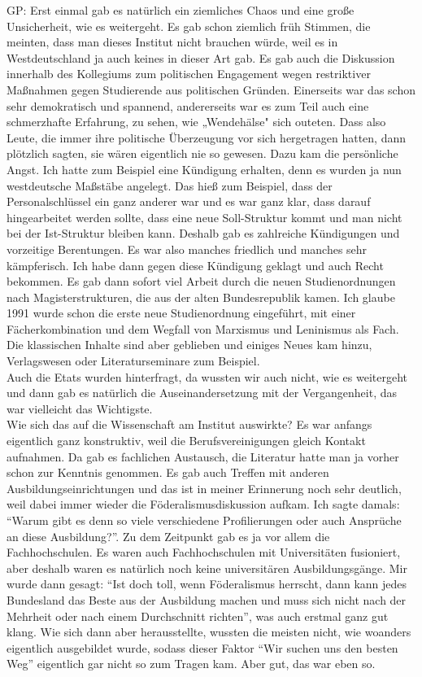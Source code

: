 \documentclass[a4paper,
fontsize=11pt,
oneside,
numbers=noperiodatend,
parskip=half-,
bibliography=totoc,
final
]{scrartcl}
\begin{document}
GP: Erst einmal gab es natürlich ein ziemliches Chaos und eine große
Unsicherheit, wie es weitergeht. Es gab schon ziemlich früh Stimmen, die
meinten, dass man dieses Institut nicht brauchen würde, weil es in
Westdeutschland ja auch keines in dieser Art gab. Es gab auch die
Diskussion innerhalb des Kollegiums zum politischen Engagement wegen
restriktiver Maßnahmen gegen Studierende aus politischen Gründen.
Einerseits war das schon sehr demokratisch und spannend, andererseits
war es zum Teil auch eine schmerzhafte Erfahrung, zu sehen, wie
„Wendehälse" sich outeten. Dass also Leute, die immer ihre politische
Überzeugung vor sich hergetragen hatten, dann plötzlich sagten, sie
wären eigentlich nie so gewesen. Dazu kam die persönliche Angst. Ich
hatte zum Beispiel eine Kündigung erhalten, denn es wurden ja nun
westdeutsche Maßstäbe angelegt. Das hieß zum Beispiel, dass der
Personalschlüssel ein ganz anderer war und es war ganz klar, dass darauf
hingearbeitet werden sollte, dass eine neue Soll-Struktur kommt und man
nicht bei der Ist-Struktur bleiben kann. Deshalb gab es zahlreiche
Kündigungen und vorzeitige Berentungen. Es war also manches friedlich
und manches sehr kämpferisch. Ich habe dann gegen diese Kündigung
geklagt und auch Recht bekommen. Es gab dann sofort viel Arbeit durch
die neuen Studienordnungen nach Magisterstrukturen, die aus der alten
Bundesrepublik kamen. Ich glaube 1991 wurde schon die erste neue
Studienordnung eingeführt, mit einer Fächerkombination und dem Wegfall
von Marxismus und Leninismus als Fach. Die klassischen Inhalte sind aber
geblieben und einiges Neues kam hinzu, Verlagswesen oder
Literaturseminare zum Beispiel.\\
Auch die Etats wurden hinterfragt, da wussten wir auch nicht, wie es
weitergeht und dann gab es natürlich die Auseinandersetzung mit der
Vergangenheit, das war vielleicht das Wichtigste.\\
Wie sich das auf die Wissenschaft am Institut auswirkte? Es war anfangs
eigentlich ganz konstruktiv, weil die Berufsvereinigungen gleich Kontakt
aufnahmen. Da gab es fachlichen Austausch, die Literatur hatte man ja
vorher schon zur Kenntnis genommen. Es gab auch Treffen mit anderen
Ausbildungseinrichtungen und das ist in meiner Erinnerung noch sehr
deutlich, weil dabei immer wieder die Föderalismusdiskussion aufkam. Ich
sagte damals: \enquote{Warum gibt es denn so viele verschiedene
Profilierungen oder auch Ansprüche an diese Ausbildung?}. Zu dem
Zeitpunkt gab es ja vor allem die Fachhochschulen. Es waren auch
Fachhochschulen mit Universitäten fusioniert, aber deshalb waren es
natürlich noch keine universitären Ausbildungsgänge. Mir wurde dann
gesagt: \enquote{Ist doch toll, wenn Föderalismus herrscht, dann kann
jedes Bundesland das Beste aus der Ausbildung machen und muss sich nicht
nach der Mehrheit oder nach einem Durchschnitt richten}, was auch
erstmal ganz gut klang. Wie sich dann aber herausstellte, wussten die
meisten nicht, wie woanders eigentlich ausgebildet wurde, sodass dieser
Faktor \enquote{Wir suchen uns den besten Weg} eigentlich gar nicht so
zum Tragen kam. Aber gut, das war eben so.
\end{document}
